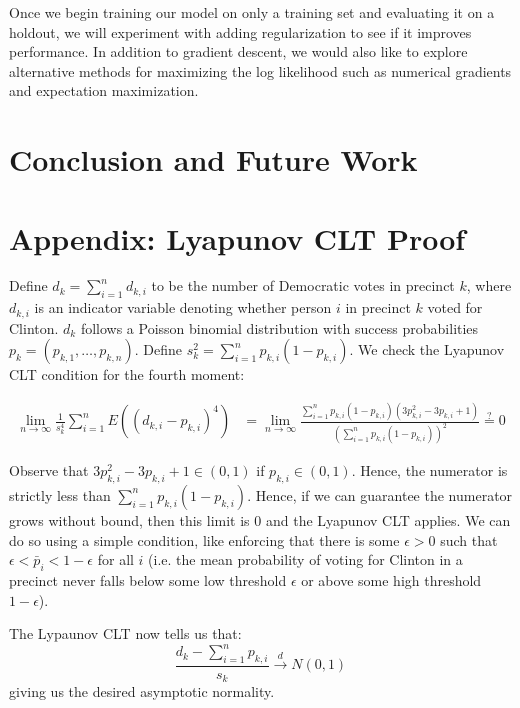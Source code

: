 \documentclass[10pt, letterpaper]{article}
\begin{document}
Once we begin training our model on only a training set and evaluating it on a holdout, we will experiment with adding regularization to see if it improves performance. In addition to gradient descent, we would also like to explore alternative methods for maximizing the log likelihood such as numerical gradients and expectation maximization.

\section{Conclusion and Future Work}

\newpage

\section*{Appendix: Lyapunov CLT Proof}

Define $d_k = \sum_{i = 1}^n d_{k, i}$ to be the number of Democratic votes in precinct $k$, where $d_{k, i}$ is an indicator variable denoting whether person $i$ in precinct $k$ voted for Clinton. $d_k$ follows a Poisson binomial distribution with success probabilities $p_k = (p_{k, 1}, \dots, p_{k, n})$. Define $s_{k}^2 = \sum_{i = 1}^{n} p_{k, i} (1-p_{k, i})$. 
We check the Lyapunov CLT \cite{billingsley1995probability} condition for the fourth moment: 

\begin{align*}
\lim_{n \to \infty} \frac{1}{s_k^4} \sum_{i = 1}^n E \left( (d_{k, i} - p_{k, i})^4 \right) &= \lim_{n \to \infty} \frac{\sum_{i = 1}^n p_{k, i}(1-p_{k, i}) \left( 3p_{k, i}^2 - 3p_{k, i} + 1 \right)}{\left(\sum_{i = 1}^n p_{k, i} \left( 1- p_{k, i} \right) \right)^2} \stackrel{?} = 0 
\end{align*}

Observe that $3p_{k, i}^2 - 3p_{k, i} + 1 \in (0, 1)$ if $p_{k, i} \in (0, 1)$. Hence, the numerator is strictly less than $\sum_{i = 1}^n p_{k, i} (1 - p_{k, i})$. Hence, if we can guarantee the numerator grows without bound, then this limit is 0 and the Lyapunov CLT applies. We can do so using a simple condition, like enforcing that there is some $\epsilon > 0$ such that $\epsilon < \bar p_i < 1- \epsilon$ for all $i$ (i.e. the mean probability of voting for Clinton in a precinct never falls below some low threshold $\epsilon$ or above some high threshold $1-\epsilon$). 

The Lypaunov CLT now tells us that: 
\[ \frac{d_k - \sum_{i = 1}^{n} p_{k, i} }{s_k} \stackrel{d} \longrightarrow N(0, 1) \] 
giving us the desired asymptotic normality. 
\end{document}
